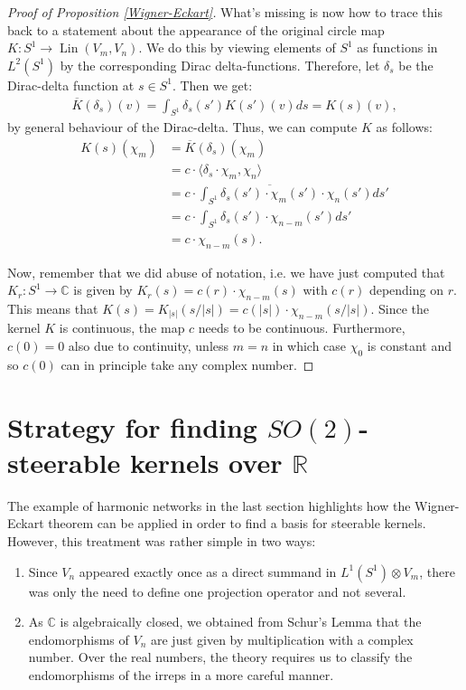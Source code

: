 \documentclass[12pt, a4paper]{article}
\theoremstyle{plain}
\theoremstyle{definition}
\theoremstyle{remark}
\newcommand{\R}{\mathds{R}}
\newcommand{\C}{\mathds{C}}
\DeclareMathOperator{\lin}{Lin}
\begin{document}
\begin{proof}[Proof of Proposition \ref{Wigner-Eckart}]
What's missing is now how to trace this back to a statement about the appearance of the original circle map $K: S^1 \to \lin(V_m, V_n)$. We do this by viewing elements of $S^1$ as functions in $L^2(S^1)$ by the corresponding Dirac delta-functions. Therefore, let $\delta_s$ be the Dirac-delta function at $s \in S^1$. Then we get:
\begin{align*}
\overline{K}(\delta_s)(v) = \int_{S^1} \delta_s(s') K(s')(v)ds = K(s)(v),
\end{align*}
by general behaviour of the Dirac-delta. Thus, we can compute $K$ as follows:
\begin{align*}
K(s)(\chi_m) & = \overline{K}(\delta_s)(\chi_m) \\
& = c \cdot \langle \delta_s \cdot \chi_m , \chi_n \rangle \\
& = c \cdot \int_{S^1} \overline{\delta_s(s')\cdot \chi_m(s')} \cdot \chi_n(s') ds' \\
& = c \cdot \int_{S^1} \delta_s(s') \cdot \chi_{n-m}(s') ds' \\
& = c \cdot \chi_{n - m}(s).
\end{align*}

Now, remember that we did abuse of notation, i.e. we have just computed that $K_r: S^1 \to \C$ is given by $K_r(s) = c(r) \cdot \chi_{n-m}(s)$ with $c(r)$ depending on $r$. This means that $K(s) = K_{|s|}(s/|s|) = c(|s|) \cdot \chi_{n-m}(s/|s|)$. Since the kernel $K$ is continuous, the map $c$ needs to be continuous. Furthermore, $c(0) = 0$ also due to continuity, unless $m = n$ in which case $\chi_0$ is constant and so $c(0)$ can in principle take any complex number.

\end{proof}

\section{Strategy for finding $SO(2)$-steerable kernels over $\R$}

The example of harmonic networks in the last section highlights how the Wigner-Eckart theorem can be applied in order to find a basis for steerable kernels. However, this treatment was rather simple in two ways:

\begin{enumerate}
\item Since $V_n$ appeared exactly once as a direct summand in $L^1(S^1) \otimes V_m$, there was only the need to define one projection operator and not several.
\item As $\C$ is algebraically closed, we obtained from Schur's Lemma that the endomorphisms of $V_n$ are just given by multiplication with a complex number. Over the real numbers, the theory requires us to classify the endomorphisms of the irreps in a more careful manner.
\end{enumerate}
\end{document}
